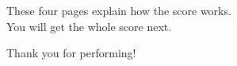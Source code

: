 \documentclass{article}
\begin{document}
\begin{center}

  \thispagestyle{empty}

  \vspace*{1in}


  \vspace{2in}

  {\LARGE

    These four pages explain how the score works.  \\
    You will get the whole score next.

    \vspace{1in}

    Thank you for performing!

  }

\end{center}
\end{document}
